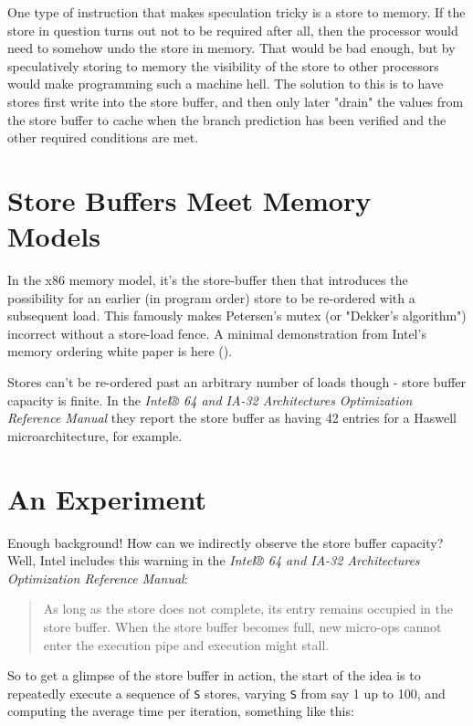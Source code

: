 \documentclass[11pt]{article}
\begin{document}
One type of instruction that makes speculation tricky is a store to memory. If the store in question turns out not to be required after all, then the processor would need to somehow undo the store in memory. That would be bad enough, but by speculatively storing to memory the visibility of the store to other processors would make programming such a machine hell. The solution to this is to have stores first write into the store buffer, and then only later "drain" the values from the store buffer to cache when the branch prediction has been verified and the other required conditions are met.

\section{Store Buffers Meet Memory Models}

In the x86 memory model, it's the store-buffer then that introduces the possibility for an earlier (in program order) store to be re-ordered with a subsequent load. This famously makes Petersen's mutex (or "Dekker's algorithm") incorrect without a store-load fence. A minimal demonstration from Intel's memory ordering white paper is here (\texttt{}).

Stores can't be re-ordered past an arbitrary number of loads though - store buffer capacity is finite. In the \emph{Intel® 64 and IA-32 Architectures Optimization Reference Manual} they report the store buffer as having 42 entries for a Haswell microarchitecture, for example.

\section{An Experiment}

Enough background! How can we indirectly observe the store buffer capacity? Well, Intel includes this warning in the \emph{Intel® 64 and IA-32 Architectures Optimization Reference Manual}: 

\begin{quote}
As long as the store does not complete, its entry remains occupied in the store buffer. When the store buffer becomes full, new micro-ops cannot enter the execution pipe and execution might stall.
\end{quote}

So to get a glimpse of the store buffer in action, the start of the idea is to repeatedly execute a sequence of \texttt{S} stores, varying \texttt{S} from say 1 up to 100, and computing the average time per iteration, something like this: 
\end{document}
